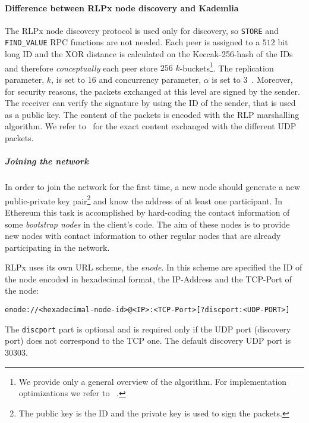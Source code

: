 \paragraph{Difference between RLPx node discovery and Kademlia}
The RLPx node discovery protocol is used only for discovery, so
\verb|STORE| and \verb|FIND_VALUE| RPC functions are not 
needed.
Each peer is assigned to a $512$ bit long ID and the XOR distance is calculated
on the Keccak-256-hash of the IDs and therefore
\emph{conceptually} each peer store $256$ $k$-buckets\footnote{
	We provide only a general overview of the algorithm. For implementation
	optimizations we refer to ~\cite{bib:kademlia}.}.
The replication parameter, $k$, is set to $16$ and concurrency parameter, $\alpha$ is set to $3$~\cite{bib:rlpx-discovery-protocol}.
Moreover, for security reasons, the packets exchanged at this level are signed
by the sender. The receiver can verify the signature by using the ID of the 
sender, that is used as a public key.
The content of the packets is encoded with the RLP marshalling algorithm.
We refer to~\cite{bib:rlpx-discovery-protocol} for the exact content exchanged 
with the different UDP packets.





\subparagraph{Joining the network}
In order to join the network for the first time, a new node should generate a
new public-private key pair\footnote{The public key is the ID and the private
key is used to sign the packets.} and know the address of at least one
participant. In Ethereum this task is accomplished by hard-coding the contact
information of some \textit{bootstrap nodes} in the client's code. The aim of
these nodes is to provide new nodes with contact information to other regular
nodes that are already participating in the network.

RLPx uses its own URL scheme, the \emph{enode}. In this scheme are specified 
the ID
of the node encoded in hexadecimal format, the IP-Address and the TCP-Port of
the node:
\begin{verbatim}
enode://<hexadecimal-node-id>@<IP>:<TCP-Port>[?discport:<UDP-PORT>]
\end{verbatim}
The \verb|discport| part is optional and is required only if the UDP port
(discovery port) does not correspond to the TCP one. The default discovery UDP
port is 30303.

